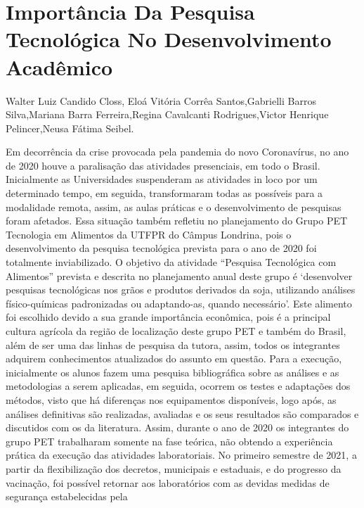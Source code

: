 


\section*{Importância Da Pesquisa Tecnológica No Desenvolvimento Acadêmico}

Walter Luiz Candido Closs, Eloá Vitória Corrêa Santos,Gabrielli Barros Silva,Mariana Barra Ferreira,Regina Cavalcanti Rodrigues,Victor Henrique Pelincer,Neusa Fátima Seibel.

Em decorrência da crise provocada pela pandemia do novo Coronavírus, no ano de 2020 houve a 
paralisação das atividades presenciais, em todo o Brasil. Inicialmente as Universidades 
suspenderam as atividades in loco por um determinado tempo, em seguida, transformaram todas 
as possíveis para a modalidade remota, assim, as aulas práticas e o desenvolvimento de pesquisas 
foram afetados. Essa situação também refletiu no planejamento do Grupo PET Tecnologia em 
Alimentos da UTFPR do Câmpus Londrina, pois o desenvolvimento da pesquisa tecnológica 
prevista para o ano de 2020 foi totalmente inviabilizado. O objetivo da atividade “Pesquisa 
Tecnológica com Alimentos” prevista e descrita no planejamento anual deste grupo é 
‘desenvolver pesquisas tecnológicas nos grãos e produtos derivados da soja, utilizando análises 
físico-químicas padronizadas ou adaptando-as, quando necessário’. Este alimento foi escolhido 
devido a sua grande importância econômica, pois é a principal cultura agrícola da região de 
localização deste grupo PET e também do Brasil, além de ser uma das linhas de pesquisa da 
tutora, assim, todos os integrantes adquirem conhecimentos atualizados do assunto em questão. 
Para a execução, inicialmente os alunos fazem uma pesquisa bibliográfica sobre as análises e as 
metodologias a serem aplicadas, em seguida, ocorrem os testes e adaptações dos métodos, visto 
que há diferenças nos equipamentos disponíveis, logo após, as análises definitivas são realizadas, 
avaliadas e os seus resultados são comparados e discutidos com os da literatura. Assim, durante o 
ano de 2020 os integrantes do grupo PET trabalharam somente na fase teórica, não obtendo a 
experiência prática da execução das atividades laboratoriais. No primeiro semestre de 2021, a 
partir da flexibilização dos decretos, municipais e estaduais, e do progresso da vacinação, foi 
possível retornar aos laboratórios com as devidas medidas de segurança estabelecidas pela 
